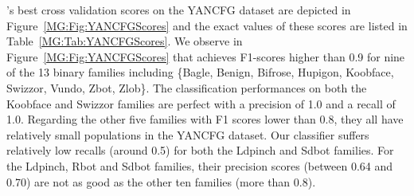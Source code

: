 

\sysname's best cross validation scores on the YANCFG dataset are depicted in Figure~\ref{MG:Fig:YANCFGScores} and the exact values of these scores are listed in Table~\ref{MG:Tab:YANCFGScores}.
We observe in Figure~\ref{MG:Fig:YANCFGScores} that \sysname achieves F1-scores higher than 0.9 for nine of the 13 binary families including \{Bagle, Benign, Bifrose, Hupigon, Koobface, Swizzor, Vundo, Zbot, Zlob\}.
The classification performances on both the Koobface and Swizzor families are perfect with a precision of 1.0 and a recall of 1.0.
Regarding the other five families with F1 scores lower than 0.8, they all have relatively small populations in the YANCFG dataset.
Our classifier suffers relatively low recalls (around 0.5) for both the Ldpinch and Sdbot families. For the Ldpinch, Rbot and Sdbot families, their precision scores (between 0.64 and 0.70) are not as good as the other ten families (more than 0.8).

